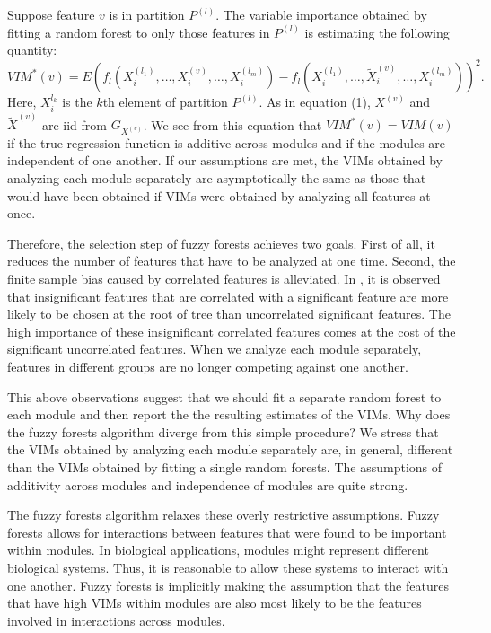 \documentclass[article,shortnames]{jss}
\begin{document}
Suppose feature $v$ is in partition $P^{(l)}$.  The variable importance obtained by fitting a random forest to only those features in  $P^{(l)}$
 is estimating the following quantity: 
 \begin{equation}
 VIM^{*}(v)=E(f_{l}(X^{(l_{1})}_{i},\ldots,X^{(v)}_{i},\ldots,X^{(l_{m})}_{i}) - f_{l}(X^{(l_{1})}_{i},\ldots,\tilde{X}^{(v)}_{i},\ldots,X^{(l_{m})}_{i}))^{2}.
 \end{equation}
 Here, $X_{i}^{l_{k}}$ is the $k$th element of partition $P^{(l)}$. As in equation (1), $X^{(v)}$ and $\tilde{X}^{(v)}$ are iid from $G_{X^{(v)}}$.
 We see from this equation that $VIM^{*}(v)=VIM(v)$ if the true regression function is additive across modules and if the modules are independent
 of one another.  If our assumptions are met, the VIMs obtained by analyzing each module separately are asymptotically the same as those that 
would have been obtained if VIMs were obtained by analyzing all features at once.       

Therefore, the selection step of fuzzy forests achieves two goals.  First of all, it reduces the number of features that have to be 
analyzed at one time.  Second, the finite sample bias caused by correlated features is alleviated.  In 
\citep{nicodemus2009predictor}, it is observed that insignificant features that are correlated with a significant feature 
are more likely to be chosen at the root of tree than uncorrelated significant features.  The high importance of these insignificant
correlated features comes at the cost of the significant uncorrelated features.  When we analyze each module separately, features 
in different groups are no longer competing against one another.   

This above observations suggest that we should fit a separate random forest to each module and then report the the resulting
estimates of the VIMs.  Why does the fuzzy forests algorithm diverge from this simple procedure?
We stress that the VIMs obtained by analyzing each module separately are, in general, different than the VIMs obtained
by fitting a single random forests.  The assumptions of additivity across modules and independence of modules are quite strong.

The fuzzy forests algorithm relaxes these overly restrictive assumptions.  Fuzzy forests allows for interactions between features that
were found to be important within modules.  In biological applications, modules might represent different biological systems.
Thus, it is reasonable to allow these systems to interact with one another.  
Fuzzy forests is implicitly making the assumption that the features that have high VIMs within modules are also most likely to be the features
involved in interactions across modules.   
\end{document}
